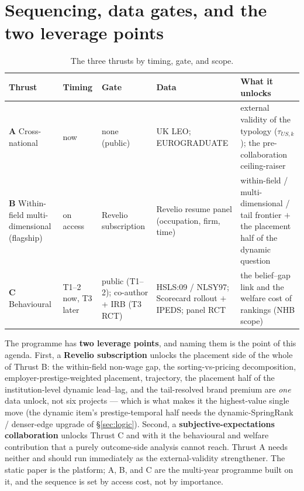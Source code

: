 \documentclass[11pt]{article}
\begin{document}
\section{Sequencing, data gates, and the two leverage points}\label{sec:sequence}
\begin{table}[h]\centering
\caption{The three thrusts by timing, gate, and scope.}
\label{tab:thrusts}
\small
\begin{tabular}{p{2.9cm}p{2.1cm}p{2.6cm}p{2.4cm}p{3.4cm}}
\toprule
Thrust & Timing & Gate & Data & What it unlocks \\
\midrule
\textbf{A} Cross-national & now & none (public) & UK LEO; EUROGRADUATE & external validity of the typology
($\tau_{US,k}$); the pre-collaboration ceiling-raiser \\
\textbf{B} Within-field multi-dimensional (flagship) & on access & Revelio subscription & Revelio resume panel
(occupation, firm, time) & within-field / multi-dimensional / tail frontier $+$ the placement half of the dynamic question \\
\textbf{C} Behavioural & T1--2 now, T3 later & public (T1--2); co-author + IRB (T3 RCT) & HSLS:09 / NLSY97;
Scorecard rollout $+$ IPEDS; panel RCT & the belief--gap link and the welfare cost of rankings (NHB scope) \\
\bottomrule
\end{tabular}
\end{table}

The programme has \textbf{two leverage points}, and naming them is the point of this agenda. First, a
\textbf{Revelio subscription} unlocks the placement side of the whole of Thrust B: the within-field non-wage gap,
the sorting-vs-pricing decomposition, employer-prestige-weighted placement, trajectory, the placement half of the
institution-level dynamic lead--lag, and the tail-resolved brand premium are \emph{one} data unlock, not six
projects --- which is what makes it the highest-value single move (the dynamic item's prestige-temporal half needs
the dynamic-SpringRank / denser-edge upgrade of \S\ref{sec:logic}). Second, a \textbf{subjective-expectations collaboration} unlocks Thrust C and with it the behavioural
and welfare contribution that a purely outcome-side analysis cannot reach. Thrust A needs neither and should run
immediately as the external-validity strengthener. The static paper is the platform; A, B, and C are the
multi-year programme built on it, and the sequence is set by access cost, not by importance.



\end{document}

